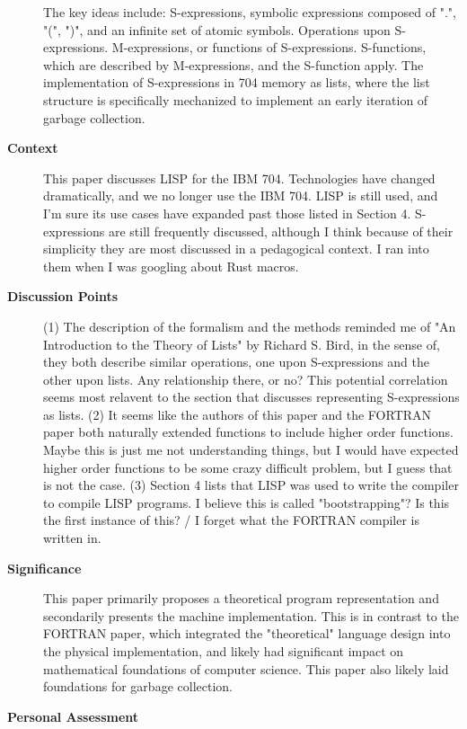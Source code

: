 \begin{description}
        The key ideas include: S-expressions, symbolic expressions composed of ".", "(", ")", and an infinite set of atomic symbols.
        Operations upon S-expressions.
        M-expressions, or functions of S-expressions.
        S-functions, which are described by M-expressions, and the S-function apply.
        The implementation of S-expressions in 704 memory as lists, where the list structure is specifically mechanized to implement an early iteration of garbage collection.
    \item[\textbf{Context}]
        This paper discusses LISP for the IBM 704.
        Technologies have changed dramatically, and we no longer use the IBM 704.
        LISP is still used, and I'm sure its use cases have expanded past those listed in Section 4.
        S-expressions are still frequently discussed, although I think because of their simplicity they are most discussed in a pedagogical context.
        I ran into them when I was googling about Rust macros.
    \item[\textbf{Discussion Points}]
        (1) The description of the formalism and the methods reminded me of "An Introduction to the Theory of Lists" by Richard S. Bird, in the sense of, they both describe similar operations, one upon S-expressions and the other upon lists.
        Any relationship there, or no?
        This potential correlation seems most relavent to the section that discusses representing S-expressions as lists.
        (2) It seems like the authors of this paper and the FORTRAN paper both naturally extended functions to include higher order functions.
        Maybe this is just me not understanding things, but I would have expected higher order functions to be some crazy difficult problem, but I guess that is not the case.
        (3) Section 4 lists that LISP was used to write the compiler to compile LISP programs.
        I believe this is called "bootstrapping"?
        Is this the first instance of this? / I forget what the FORTRAN compiler is written in.
    \item[\textbf{Significance}]
        This paper primarily proposes a theoretical program representation and secondarily presents the machine implementation.
        This is in contrast to the FORTRAN paper, which integrated the "theoretical" language design into the physical implementation, and likely had significant impact on mathematical foundations of computer science.
        This paper also likely laid foundations for garbage collection.
    \item[\textbf{Personal Assessment}]
\end{description}